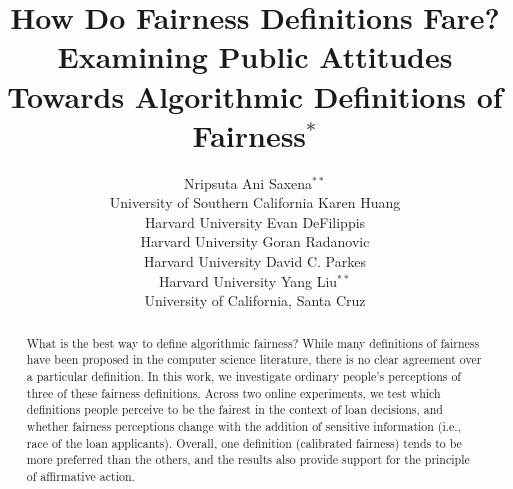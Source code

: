 \documentclass[letterpaper]{article} %
\begin{document}
%
\title{How Do Fairness Definitions Fare? \\
Examining Public Attitudes Towards Algorithmic Definitions of Fairness$^*$ }
\author{Nripsuta Ani Saxena$^{**}$ \\ University of Southern California \And Karen Huang\\ Harvard University \And Evan DeFilippis\\ Harvard University \AND Goran Radanovic\\ Harvard University \And David C. Parkes\\ Harvard University \And Yang Liu$^{**}$ \\ University of California, Santa Cruz}







\maketitle
\begin{abstract}
  What is the best way to define algorithmic fairness?  While many
  definitions of fairness have been proposed in the computer science
  literature, there is no clear agreement over a particular
  definition. In this work, we investigate ordinary people's
  perceptions of three of these fairness definitions. Across two
  online experiments, we test which definitions people perceive to be
  the fairest in the context of loan decisions, and whether fairness
  perceptions change with the addition of sensitive information (i.e.,
  race of the loan applicants). Overall, one definition (calibrated
  fairness) tends to be more preferred than the others, and the
  results also provide support for the principle of affirmative
  action.
\end{abstract}

\let\thefootnote\relax{}

\let\thefootnote\relax{}
\end{document}
